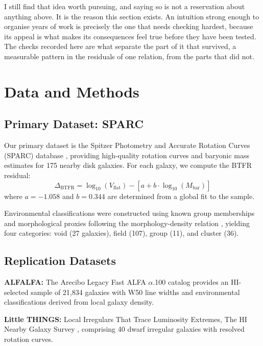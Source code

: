 \documentclass[12pt,a4paper]{article}
\newcommand{\Mbar}{M_{\text{bar}}}
\newcommand{\Vflat}{V_{\text{flat}}}
\begin{document}
I still find that idea worth pursuing, and saying so is not a reservation about anything above. It is the reason this section exists. An intuition strong enough to organise years of work is precisely the one that needs checking hardest, because its appeal is what makes its consequences feel true before they have been tested. The checks recorded here are what separate the part of it that survived, a measurable pattern in the residuals of one relation, from the parts that did not.

\section{Data and Methods}
\label{sec:data}

\subsection{Primary Dataset: SPARC}

Our primary dataset is the Spitzer Photometry and Accurate Rotation Curves (SPARC) database \citep{Lelli2016}, providing high-quality rotation curves and baryonic mass estimates for 175 nearby disk galaxies. For each galaxy, we compute the BTFR residual:
\begin{equation}
\Delta_{\text{BTFR}} = \log_{10}(\Vflat) - \left[ a + b \cdot \log_{10}(\Mbar) \right]
\label{eq:residual}
\end{equation}
where $a = -1.058$ and $b = 0.344$ are determined from a global fit to the sample.

Environmental classifications were constructed using known group memberships and morphological proxies following the morphology-density relation \citep{Dressler1980}, yielding four categories: void (27 galaxies), field (107), group (11), and cluster (36).

\subsection{Replication Datasets}

\textbf{ALFALFA:} The Arecibo Legacy Fast ALFA $\alpha$.100 catalog \citep{Haynes2018} provides an HI-selected sample of 21,834 galaxies with W50 line widths and environmental classifications derived from local galaxy density.

\textbf{Little THINGS:} Local Irregulars That Trace Luminosity Extremes, The HI Nearby Galaxy Survey \citep{Hunter2012}, comprising 40 dwarf irregular galaxies with resolved rotation curves.
\end{document}
